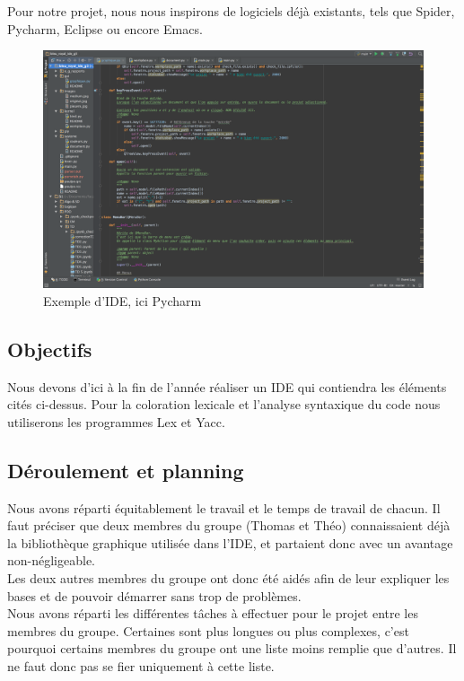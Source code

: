 \documentclass[a4paper,12pt]{article}
\begin{document}
	Pour notre projet, nous nous inspirons de logiciels déjà existants, tels que Spider, Pycharm, Eclipse ou encore Emacs.
	\begin{figure}[h!]
		\begin{center}
			\includegraphics[scale=0.3]{images/pycharm}
			\caption{Exemple d'IDE, ici Pycharm}
		\end{center}
	\end{figure}
	
	\subsection{Objectifs}
	
	Nous devons d'ici à la fin de l'année réaliser un IDE qui contiendra les éléments cités ci-dessus. Pour la coloration lexicale et l'analyse syntaxique du code nous utiliserons les programmes Lex et Yacc.
	
	\subsection{Déroulement et planning}
	
	Nous avons réparti équitablement le travail et le temps de travail de chacun. Il faut préciser que deux membres du groupe (Thomas et Théo) connaissaient déjà la bibliothèque graphique utilisée dans l'IDE, et partaient donc avec un avantage non-négligeable. \\
	Les deux autres membres du groupe ont donc été aidés afin de leur expliquer les bases et de pouvoir démarrer sans trop de problèmes.\\
	
	Nous avons réparti les différentes tâches à effectuer pour le projet entre les membres du groupe. Certaines sont plus longues ou plus complexes, c'est pourquoi certains membres du groupe ont une liste moins remplie que d'autres. Il ne faut donc pas se fier uniquement à cette liste.\\
	
\end{document}
